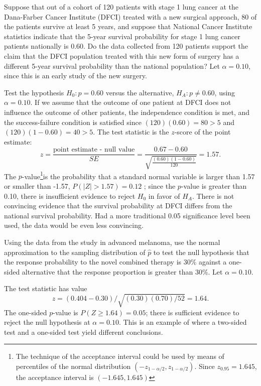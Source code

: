 \begin{examplewrap}
\begin{nexample}{Suppose that out of a cohort of 120 patients with stage 1 lung cancer at the Dana-Farber Cancer Institute (DFCI) treated with a new surgical approach, 80 of the patients survive at least 5 years, and suppose that National Cancer Institute statistics indicate that the 5-year survival probability for stage 1 lung cancer patients nationally is 0.60. Do the data collected from 120 patients support the claim that the DFCI population treated with this new form of surgery has a different 5-year survival probability than the national population? Let $\alpha = 0.10$, since this is an early study of the new surgery.}

Test the hypothesis $H_0: p = 0.60$ versus the alternative, $H_A:  p \neq 0.60$, using $\alpha = 0.10$. If we assume that the outcome of one patient at DFCI does not influence the outcome of other patients, the independence condition is met, and the success-failure condition is satisfied since $(120)(0.60) = 80 > 5$ and $(120)(1-0.60) = 40 > 5.$ The test statistic is the $z$-score of the point estimate: 
\[z = \dfrac{\text{point estimate - null value}}{SE} = \dfrac{0.67 - 0.60}{\sqrt{\frac{(0.60)(1-0.60)}{120}}} = 1.57. \]
The $p$-value\footnote{The technique of the acceptance interval could be used by means of percentiles of the normal distribution  $(-z_{1-\alpha/2} , z_{1-\alpha/2} )$. Since $z_{0.95}=1.645$, the acceptance interval is $(-1.645,1.645)$}is the probability that a standard normal variable is larger than 1.57 or smaller than -1.57, $P(|Z| > 1.57) = 0.12$ ; since the $p$-value is greater than 0.10, there is insufficient evidence to reject $H_0$ in favor of $H_A$. There is not convincing evidence that the survival probability at DFCI differs from the national survival probability.  Had a more traditional 0.05 significance level been used, the data would be even less convincing. 
\end{nexample}
\end{examplewrap}

\begin{examplewrap}
\begin{nexample}{Using the data from the study in advanced melanoma, use the normal approximation to the sampling distribution of $\hat{p}$ to test the null hypothesis that the response probability to the novel combined therapy is 30\% against a one-sided alternative that the response proportion is greater than 30\%. Let $\alpha = 0.10$.}

The test statistic has value 
\[
z = (0.404 - 0.30)/\sqrt{(0.30)(0.70)/52} = 1.64. 
\] 
The one-sided $p$-value is $P(Z \geq 1.64) = 0.05$; there is sufficient evidence to reject the null hypothesis at $\alpha = 0.10$. This is an example of where a two-sided test and a one-sided test yield different conclusions.
\end{nexample}
\end{examplewrap}

